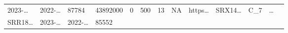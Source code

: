 \documentclass[
]{article}
\begin{document}
\begin{longtable}[]{@{}lllllllllllll@{}}
\begin{minipage}[t]{0.05\columnwidth}
2023-\ldots{}\strut
\end{minipage} & \begin{minipage}[t]{0.05\columnwidth}\raggedright
2022-\ldots{}\strut
\end{minipage} & \begin{minipage}[t]{0.04\columnwidth}\raggedright
87784\strut
\end{minipage} & \begin{minipage}[t]{0.05\columnwidth}\raggedright
43892000\strut
\end{minipage} & \begin{minipage}[t]{0.05\columnwidth}\raggedright
0\strut
\end{minipage} & \begin{minipage}[t]{0.05\columnwidth}\raggedright
500\strut
\end{minipage} & \begin{minipage}[t]{0.05\columnwidth}\raggedright
13\strut
\end{minipage} & \begin{minipage}[t]{0.05\columnwidth}\raggedright
NA\strut
\end{minipage} & \begin{minipage}[t]{0.05\columnwidth}\raggedright
https\ldots{}\strut
\end{minipage} & \begin{minipage}[t]{0.05\columnwidth}\raggedright
SRX14\ldots{}\strut
\end{minipage} & \begin{minipage}[t]{0.08\columnwidth}\raggedright
C\_7\strut
\end{minipage} & \begin{minipage}[t]{0.02\columnwidth}\raggedright
\ldots{}\strut
\end{minipage}\tabularnewline
\begin{minipage}[t]{0.05\columnwidth}\raggedright
SRR18\ldots{}\strut
\end{minipage} & \begin{minipage}[t]{0.05\columnwidth}\raggedright
2023-\ldots{}\strut
\end{minipage} & \begin{minipage}[t]{0.05\columnwidth}\raggedright
2022-\ldots{}\strut
\end{minipage} & \begin{minipage}[t]{0.04\columnwidth}\raggedright
85552\strut
\end{minipage} & \begin{minipage}[t]{0.05\columnwidth}\raggedright

\end{minipage}
\end{longtable}
\end{document}
